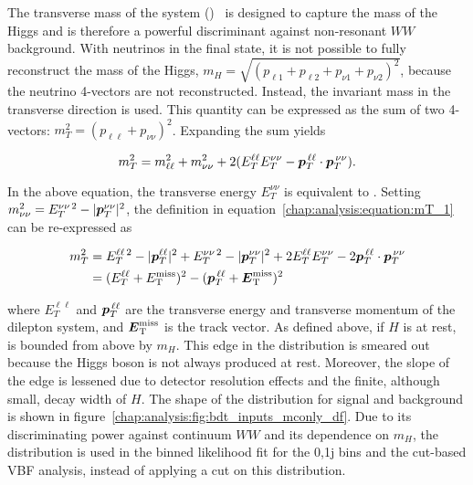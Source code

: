 The transverse mass of the \wwlnln system
(\mT)~\cite{bib:PhysRevD:43779,bib:Barr:2009mx} is
designed to capture the mass of the Higgs and is therefore a powerful
discriminant against non-resonant $WW$ background. With neutrinos in
the final state, it is not possible to fully reconstruct the mass of
the Higgs, $m_H = \sqrt{(p_{\ell 1} + p_{\ell 2} + p_{\nu 1} + p_{\nu
2})^2}$, because the neutrino 4-vectors are not reconstructed. Instead,
the invariant mass in the transverse direction is used. This quantity
can be expressed as the sum of two 4-vectors: $m_T^2 = (p_{\ell\ell} +
p_{\nu\nu})^2$. Expanding the sum yields

\begin{equation}
\label{chap:analysis:equation:mT_1}
m_T^2 = m_{\ell\ell}^2 + m_{\nu\nu}^2 +
2(E_{T}^{\ell\ell}E_{T}^{\nu\nu}-\boldsymbol{p}_T^{\,\ell\ell}\cdot\boldsymbol{p}_T^{\,\nu\nu}).
\end{equation}

\noindent In the above equation, the transverse energy $E_{T}^{\nu\nu}$
is equivalent to \etmiss. Setting $m_{\nu\nu}^2 = E_{T}^{\nu\nu\,2} -
|\boldsymbol{p}_T^{\nu\nu}|^2$, the definition in
equation~\ref{chap:analysis:equation:mT_1} can be re-expressed as

\begin{equation}
\begin{aligned}
\label{chap:analysis:equation:mT_2}
m_T^2 & = E_{T}^{\ell\ell\,2} - |\boldsymbol{p}_T^{\ell\ell}|^2 +
E_{T}^{\nu\nu\,2} - |\boldsymbol{p}_T^{\nu\nu}|^2 +
2E_{T}^{\ell\ell}E_{T}^{\nu\nu} -
2\boldsymbol{p}_T^{\,\ell\ell}\cdot\boldsymbol{p}_T^{\,\nu\nu} \\
& = (E_{T}^{\ell\ell} + E_{\mathrm{T}}^{\rm miss})^2 - (\boldsymbol{p}_T^{\,\ell\ell} +
\boldsymbol{E}_{\mathrm{T}}^{\rm miss})^2
\end{aligned}
\end{equation}

\noindent
where $E_{T}^{\ell\ell}$ and $\boldsymbol{p}_T^{\,\ell\ell}$ are the transverse
energy and transverse momentum of the dilepton system,
and $\boldsymbol{E}_{\mathrm{T}}^{\rm miss}$ is the track \etmiss vector. As defined
above, if $H$ is at rest, \mT is bounded from above by $m_H$. This
edge in the distribution is smeared out because the Higgs boson is not
always produced at rest. Moreover, the slope of the edge is lessened due to
detector resolution effects and the finite, although small, decay
width of $H$. The shape of the distribution for signal and background
is shown in figure~\ref{chap:analysis:fig:bdt_inputs_mconly_df}. Due to its discriminating power against
continuum $WW$ and its dependence on $m_H$, the \mT distribution is
used in the binned likelihood fit for the 0,1j bins and the cut-based VBF
analysis, instead of applying a cut on this distribution. 

